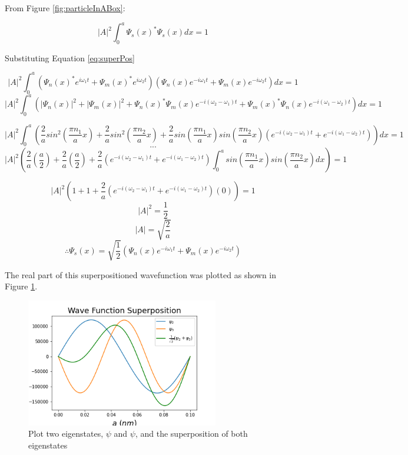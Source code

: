 From Figure \ref{fig:particleInABox}:

$$\left | A \right |^2 \int_{0}^{a} \Psi_s (x)^{*} \Psi_s (x)dx = 1$$

Substituting Equation \ref{eq:superPos}

$$\left | A \right |^2 \int_{0}^{a} (\Psi_n (x)^{*}e^{i \omega_{1} t} + \Psi_m (x)^{*}e^{i \omega_{2} t}) (\Psi_n (x)e^{-i \omega_{1} t} + \Psi_m (x)e^{-i \omega_{2} t})dx = 1$$
$$\left | A \right |^2 \int_{0}^{a} (\left | \Psi_n (x) \right |^2 + \left | \Psi_m (x) \right |^2 + \Psi_n (x)^{*}\Psi_m (x)e^{-i(\omega_{2}- \omega_{1}) t} + \Psi_m (x)^{*}\Psi_n (x)e^{-i(\omega_{1}- \omega_{2}) t})dx = 1$$

$$ \left | A \right |^2 \int_{0}^{a}\left(\frac{2}{a} sin^{2}(\frac{\pi n_1}{a}x)+\frac{2}{a} sin^{2}(\frac{\pi n_2}{a}x)+\frac{2}{a} sin(\frac{\pi n_1}{a}x)sin(\frac{\pi n_2}{a}x)(e^{-i(\omega_{2}- \omega_{1})t}+e^{-i(\omega_{1}- \omega_{2})t})\right)dx = 1$$
$$...$$
$$\left | A \right |^2 \left( \frac{2}{a}\left(\frac{a}{2}\right) + \frac{2}{a}\left(\frac{a}{2}\right) + \frac{2}{a}(e^{-i(\omega_{2}- \omega_{1})t}+e^{-i(\omega_{1}- \omega_{2})t})\int_{0}^{a} sin(\frac{\pi n_1}{a}x)sin(\frac{\pi n_2}{a}x)dx \right)=1$$

$$\left | A \right |^2 \left( 1 + 1 + \frac{2}{a}(e^{-i(\omega_{2}- \omega_{1})t}+e^{-i(\omega_{1}- \omega_{2})t})(0) \right)=1$$
$$\left | A \right |^2 = \frac{1}{2}$$
$$\left | A \right | = \sqrt{\frac{2}{a}}$$
$$\therefore \Psi_s (x) = \sqrt{\frac{1}{2}} \left( \Psi_n (x)e^{-i \omega_{1} t} + \Psi_m (x)e^{-i \omega_{2} t}\right)$$

The real part of this superpositioned wavefunction was plotted as shown in Figure \ref{fig:superPosWave}.

\begin{figure}[h]
    \centering
    \includegraphics[width=0.75\textwidth]{lab1/superpositionWave.png}
    \caption{Plot two eigenstates, $\psi$ and $\psi$, and the superposition of both eigenstates}
    \label{fig:superPosWave}
\end{figure}

